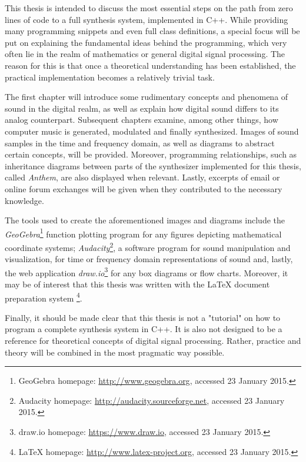 \pagebreak

This thesis is intended to discuss the most essential steps on the path from zero lines of code to a full synthesis system, implemented in C++. While providing many programming snippets and even full class definitions\footnotemark{}, a special focus will be put on explaining the fundamental ideas behind the programming, which very often lie in the realm of mathematics or general digital signal processing. The reason for this is that once a theoretical understanding has been established, the practical implementation becomes a relatively trivial task.\parbreak


The first chapter will introduce some rudimentary concepts and phenomena of sound in the digital realm, as well as explain how digital sound differs to its analog counterpart. Subsequent chapters examine, among other things, how computer music is generated, modulated and finally synthesized. Images of sound samples in the time and frequency domain, as well as diagrams to abstract certain concepts, will be provided. Moreover, programming relationships, such as inheritance diagrams between parts of the synthesizer implemented for this thesis, called \emph{Anthem}, are also displayed when relevant. Lastly, excerpts of email or online forum exchanges will be given when they contributed to the necessary knowledge. \parbreak

The tools used to create the aforementioned images and diagrams include the \emph{GeoGebra}\footnote{GeoGebra homepage: \url{http://www.geogebra.org}, accessed 23 January 2015.} function plotting program for any figures depicting mathematical coordinate systems; \emph{Audacity}\footnote{Audacity homepage: \url{http://audacity.sourceforge.net}, accessed 23 January 2015.}, a software program for sound manipulation and visualization, for time or frequency domain representations of sound and, lastly, the web application \emph{draw.io}\footnote{draw.io homepage: \url{https://www.draw.io}, accessed 23 January 2015.} for any box diagrams or flow charts. Moreover, it may be of interest that this thesis was written with the \LaTeX{} document preparation system \footnote{\LaTeX{} homepage: \url{http://www.latex-project.org}, accessed 23 January 2015.}. \parbreak

Finally, it should be made clear that this thesis is not a "tutorial" on how to program a complete synthesis system in C++. It is also not designed to be a reference for theoretical concepts of digital signal processing. Rather, practice and theory will be combined in the most pragmatic way possible.
